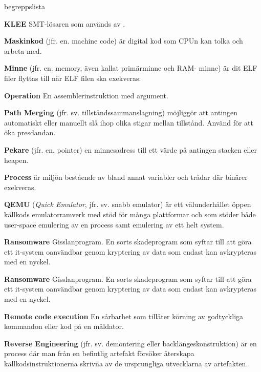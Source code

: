 \begin{labeling}{begreppslista}
    \item [\textbf{KLEE}] SMT-lösaren som används av \stoe{}.

    \item [\textbf{Maskinkod}] (jfr. en. machine code) är digital kod som CPUn
    kan tolka och arbeta med.

    \item [\textbf{Minne}] (jfr. en. memory, även kallat primärminne och RAM-
          minne) är dit ELF filer flyttas till när ELF filen ska exekveras.

    \item [\textbf{Operation}] En assemblerinstruktion med argument.

    \item [\textbf{Path Merging}] (jfr. sv. tillståndssammanslagning) möjliggör
    att antingen automatiskt eller manuellt slå ihop olika stigar mellan
    tillstånd.  Använd för att öka presdandan.

    \item [\textbf{Pekare}] (jfr. en. pointer) en minnesadress till ett värde på
    antingen stacken eller heapen.

    \item [\textbf{Process}] är miljön bestående av bland annat variabler och
    trådar där binärer exekveras.

    \item [\textbf{QEMU}] (\emph{Quick Emulator}, jfr. sv. snabb emulator) är
    ett välunderhållet öppen källkods emulatorramverk med stöd för många
    plattformar och som stöder både user-space emulering av en process samt
    emulering av ett helt system.

    \item [\textbf{Ransomware}] Gisslanprogram. En sorts skadeprogram som syftar
    till att göra ett it-system oanvändbar genom kryptering av data som endast
    kan avkrypteras med en nyckel.

    \item [\textbf{Ransomware}] Gisslanprogram. En sorts skadeprogram som syftar
    till att göra ett it-system oanvändbar genom kryptering av data som endast
    kan avkrypteras med en nyckel.

    \item [\textbf{Remote code execution}] En sårbarhet som tillåter körning av
    godtyckliga kommandon eller kod på en måldator.

    \item [\textbf{Reverse Engineering}] (jfr. sv. demontering eller
          backlängeskonstruktion) är en process där man från en befintlig artefakt
    försöker återskapa källkodsinstruktionerna skrivna av de ursprungliga
    utvecklarna av artefakten.


\end{labeling}
